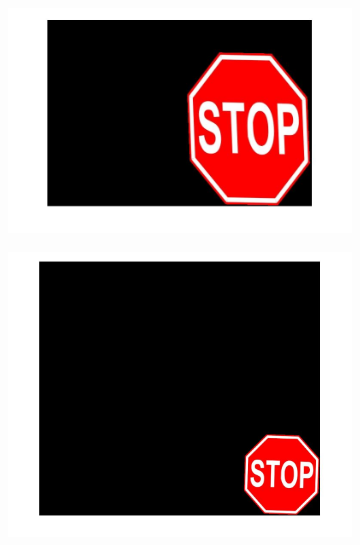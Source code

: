 \documentclass[a4paper]{iacas}
\begin{document}
\begin{figure}[!htbp]
	
	\begin{subfigure}[b]{0.32\textwidth}
		\includegraphics[width=\textwidth]{502.jpg}
		\caption{}
		\label{fig:502}
	\end{subfigure}
	\begin{subfigure}[b]{0.32\textwidth}
		\includegraphics[width=\textwidth]{503.jpg}
		\caption{}
		\label{fig:503}
	\end{subfigure}
	\begin{subfigure}[b]{0.32\textwidth}

\end{subfigure}
\end{figure}
\end{document}
